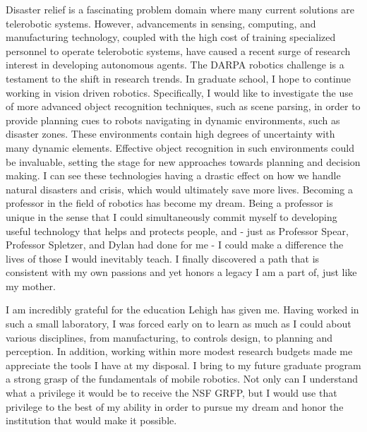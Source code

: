 \documentclass[10pt]{article}
\begin{document}
Disaster relief is a fascinating problem domain where many current solutions
are telerobotic systems. However, advancements in sensing, computing, and
manufacturing technology, coupled with the high cost of training specialized
personnel to operate telerobotic systems, have caused a recent surge of
research interest in developing autonomous agents. The DARPA robotics challenge
is a testament to the shift in research trends. In graduate school, I hope to
continue working in vision driven robotics.  Specifically, I would like to
investigate the use of more advanced object recognition techniques, such as
scene parsing, in order to provide planning cues to robots navigating in
dynamic environments, such as disaster zones.  These environments contain high
degrees of uncertainty with many dynamic elements. Effective object recognition
in such environments could be invaluable, setting the stage for new approaches
towards planning and decision making. I can see these technologies having a
drastic effect on how we handle natural disasters and crisis, which would
ultimately save more lives. Becoming a professor in the field of robotics has
become my dream. Being a professor is unique in the sense that I could
simultaneously commit myself to developing useful technology that helps and
protects people, and - just as Professor Spear, Professor Spletzer, and Dylan
had done for me - I could make a difference the lives of those I would
inevitably teach. I finally discovered a path that is consistent with my own
passions and yet honors a legacy I am a part of, just like my mother.

I am incredibly grateful for the education Lehigh has given me. Having worked
in such a small laboratory, I was forced early on to learn as much as I could
about various disciplines, from manufacturing, to controls design, to planning
and perception. In addition, working within more modest research budgets made
me appreciate the tools I have at my disposal. I bring to my future graduate
program a strong grasp of the fundamentals of mobile robotics. Not only can I
understand what a privilege it would be to receive the NSF GRFP, but I would
use that privilege to the best of my ability in order to pursue my dream and
honor the institution that would make it possible.
\end{document}
